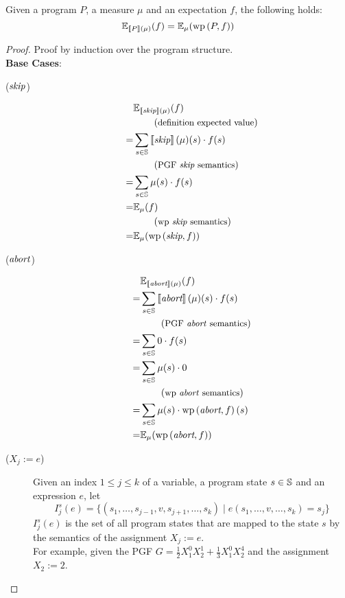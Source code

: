 \begin{theorem}
	Given a program $P$, a measure $\mu$ and an expectation $f$, the following holds:
	\[ \E_{\smtx{P}(\mu)} (f) = \E_\mu (\wp{P, f}) \]
	\begin{proof}
		Proof by induction over the program structure. \\
		\textbf{Base Cases}:
		\begin{description}
			\item[($\nop$)] \begin{align*}
				  & \E_{\smtx{\nop}(\mu)} (f) \\
				  & \explain{definition expected value} \\
				= & \sum_{s \in \S} \smtx{\nop}(\mu)(s) \cdot f(s) \\
				  & \explain{PGF \nop\ semantics} \\
				= & \sum_{s \in \S} \mu(s) \cdot f(s) \\
				= & \E_\mu (f) \\
				  & \explain{wp \nop\ semantics} \\
				= & \E_\mu (\wp{\nop, f})
			\end{align*}
			\item[($\abort$)] \begin{align*}
				  & \E_{\smtx{\abort}(\mu)} (f) \\
				= & \sum_{s \in \S} \smtx{\abort}(\mu)(s) \cdot f(s) \\
				  & \explain{PGF \abort\ semantics} \\
				= & \sum_{s \in \S} 0 \cdot f(s) \\
				= & \sum_{s \in \S} \mu(s) \cdot 0 \\
				  & \explain{wp \abort\ semantics} \\
				= & \sum_{s \in \S} \mu(s) \cdot \wp{\abort, f}(s) \\
				= & \E_\mu (\wp{\abort, f})
			\end{align*}
			\item[($X_j := e$)] Given an index $1 \leq j \leq k$ of a variable,
				a program state $s \in \S$ and an expression $e$, let
				$$ I_j^s(e) = \{ (s_1, \dots, s_{j-1}, v, s_{j+1}, \dots, s_k) \mid
					e(s_1, \dots, v, \dots, s_k) = s_j \} $$
				$I_j^s(e)$ is the set of all program states that are mapped to the state $s$ by the semantics of the assignment $X_j := e$. \\
				For example, given the PGF $G = \frac{1}{2} X_1^0 X_2^1 + \frac{1}{3} X_1^0 X_2^4$ and the assignment $X_2 := 2$. %

\end{description}
\end{proof}
\end{theorem}
